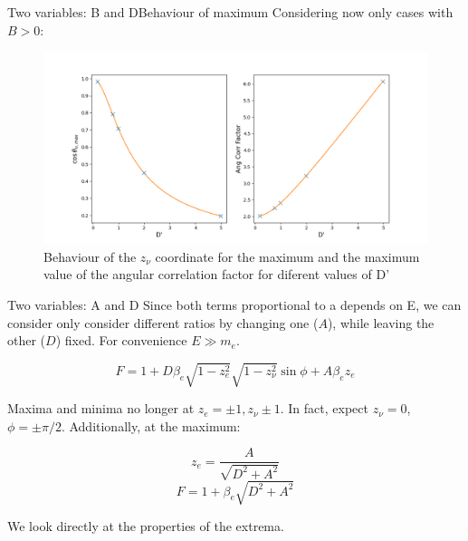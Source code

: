 \documentclass{beamer}
\begin{document}
\begin{frame}{Two variables: B and D}{Behaviour of maximum}
	Considering now only cases with $B > 0$:
	\begin{figure}
		\centering
		\includegraphics[width=0.8\paperwidth]{plots/BD_max_behaviour}
		\caption{Behaviour of the $z_\nu$ coordinate for the maximum and the maximum value of the angular correlation factor for diferent values of D'}
	\end{figure}
\end{frame}
\begin{frame}{Two variables: A and D}
	Since both terms proportional to a depends on E, we can consider only consider different ratios by changing one ($A$), while leaving the other ($D$) fixed. For convenience $E \gg m_e$.

	$$F = 1 + D\beta_e\sqrt{1-z^2_e}\sqrt{1-z^2_\nu}\sin \phi + A\beta_ez_e$$
	
	Maxima and minima no longer at $z_e=\pm1,z_\nu \pm1$. In fact, expect $z_\nu = 0$, $\phi = \pm\pi/2$. Additionally, at the maximum:
	
	$$z_e = \frac A{\sqrt{D^2+A^2}}$$
	$$F = 1 + \beta_e\sqrt{D^2+A^2}$$    

	We look directly at the properties of the extrema.
\end{frame}
\end{document}
